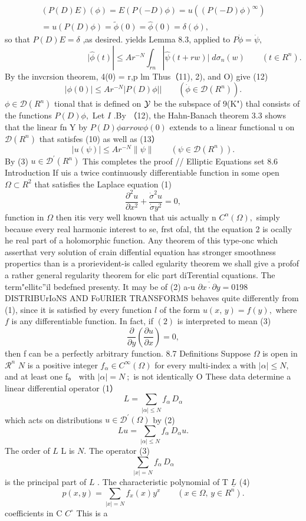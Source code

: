 $$ \begin{array}{c}{{(P(D)E)(\phi)=E(P(-D)\phi)=u((P(-D)\phi)^{\infty})}}\\ {{=u(P(D)\phi)=\tilde{\phi}(0)=\hat{\phi}(0)=\delta(\phi),}}\end{array} $$ so that $P(D)E=\delta$ ,as desired. yields Lemma 8.3, applied to $P{\dot{\phi}}={\dot{\psi}},$ $$ \quad\quad\quad\quad\quad\quad\quad\quad\quad\quad\Big|\hat{\phi}(t)|\leq A r^{-N}\int_{r n}|\hat{\psi}(t+r w)|\;d\sigma_{n}(w)\qquad(t\in R^{n}). $$ By the invcrsion theorem, 4(0) = r,p lm Thus（11), 2), and O) give (12) $$ \vert\phi(0)\vert\leq A r^{-N}\vert P(D)\phi\vert\vert\qquad(\dot{\phi}\in{\mathcal D}(R^{n})). $$ $\phi\in{\mathcal{D}}(R^{n})$ tional that is defined on ${\cal{Y}}$ be the subspace of 9(K") thal consists of the functions $P(D)\phi,$ Let $\boldsymbol{\mathit{I}}$ .By （12), the Hahn-Banach theorem 3.3 shows that the linear fn Y by $P(D)\phi arrow\phi(0)$ extends to a linear functional u on ${\mathcal{D}}(R^{n})$ that satisfes (10) as well as (13） $$ \left|u(\psi)\right|\leq A r^{-N}\|\psi\|\qquad(\psi\in{\mathcal{D}}(R^{n})). $$ By (3) $u\in{\mathcal{D}}^{\prime}(R^{n})$ This completes the proof // Elliptic Equations set 8.6 Introduction If uis a twice continuously differentiable function in some open $\Omega\subset R^{2}$ that satisfies the Laplace equation (1) $$ {\frac{\partial^{2}u}{\partial x^{2}}}+{\frac{\dot{\sigma}^{2}u}{\dot{\sigma}y^{2}}}=0, $$ function in $\Omega$ then itis very well known that uis actually n $C^{\alpha}(\Omega),$ simply because every real harmonic interest to se, frst ofal, tht the equation 2 is ocally he real part of a holomorphic function. Any theorem of this type-onc which asserthat very solution of crain diffential equation has stronger smoothness propertics than is a prorievident-is called egularity theorem we shall give a profof a rather general regularity theorem for elic part diTerential cquations. The term"ellitc”il bedefned presenty. It may be of (2) a-u ${\overline{{\partial x\cdot\!\partial y}}}=0$198 DISTRIBUrIoNS AND FoURIER TRANSFORMS behaves quite differently from (1), since it is satisfied by every function $\boldsymbol{\mathit{l}}$ of the form $u(x,\,y)=f(y),$ where $\boldsymbol{\mathit{f}}$ is any differentiable function. In fact, if $\operatorname{\left(2\right)}$ is interpreted to mean (3) $$ \frac{\partial}{\partial y}\left(\frac{\partial u}{\partial x}\right)=0, $$ then f can be a perfectly arbitrary function. 8.7 Definitions Suppose $\Omega$ is open in $\textstyle{\mathcal{R}}^{n}$ $\textstyle N$ is a positive integer $f_{\alpha}\in C^{\infty}(\Omega)$ for every multi-index a with $|\alpha|\leq N,$ and at least one f。 with $\left|\alpha\right|=N\ ;$ is not identically O These data determine a linear differential operator (1） $$ L=\sum_{|\alpha|\leq N}f_{\alpha}\,D_{\alpha} $$ which acts on distributions $u\in{\mathcal{D}}^{\prime}(\Omega)$ by (2) $$ L u=\sum_{|\alpha|\leq N}f_{\alpha}\,D_{\alpha}u. $$ The order of $\boldsymbol{\mathit{L}}$ L is $N.$ The operator (3) $$ \sum_{|x|=N}f_{\alpha}\,D_{\alpha} $$ is the principal part of $\boldsymbol{\mathit{L}}$ . The characteristic polynomial of T $\underline{{L}}$ (4) $$ p(x,y)=\sum_{|x|=N}f_{x}(x)y^{x}\qquad(x\in\Omega,\,y\in R^{n}). $$ coefficients in C $C^{\circ}$ This is a 